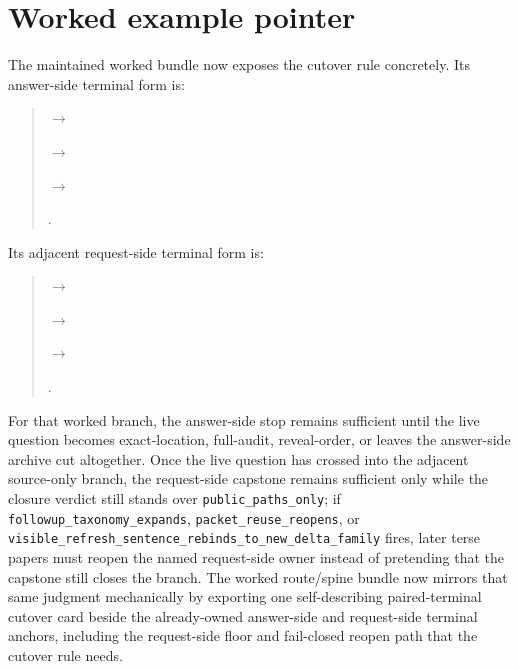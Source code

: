 \documentclass[11pt]{article}
\begin{document}
\section{Worked example pointer}
The maintained worked bundle now exposes the cutover rule concretely.
Its answer-side terminal form is:
\begin{quote}\small
{}\par
$\to$\par
{}\par
$\to$\par
{}\par
$\to$\par
{}.
\end{quote}
Its adjacent request-side terminal form is:
\begin{quote}\small
{}\par
$\to$\par
{}\par
$\to$\par
{}\par
$\to$\par
{}.
\end{quote}
For that worked branch, the answer-side stop remains sufficient until the live question becomes exact-location, full-audit, reveal-order, or leaves the answer-side archive cut altogether.
Once the live question has crossed into the adjacent source-only branch, the request-side capstone remains sufficient only while the closure verdict still stands over \texttt{public\_paths\_only}; if \texttt{followup\_taxonomy\_expands}, \texttt{packet\_reuse\_reopens}, or \texttt{visible\_refresh\_sentence\_rebinds\_to\_new\_delta\_family} fires, later terse papers must reopen the named request-side owner instead of pretending that the capstone still closes the branch.
The worked route/spine bundle now mirrors that same judgment mechanically by exporting one self-describing paired-terminal cutover card beside the already-owned answer-side and request-side terminal anchors, including the request-side floor and fail-closed reopen path that the cutover rule needs.
\end{document}
